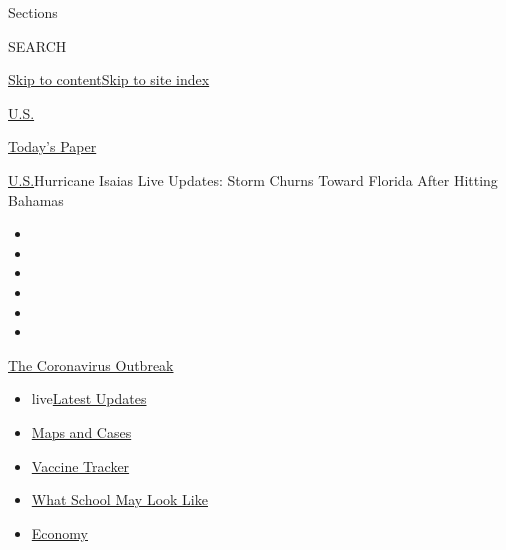 Sections

SEARCH

\protect\hyperlink{site-content}{Skip to
content}\protect\hyperlink{site-index}{Skip to site index}

\href{https://www.nytimes3xbfgragh.onion/section/us}{U.S.}

\href{https://myaccount.nytimes3xbfgragh.onion/auth/login?response_type=cookie\&client_id=vi}{}

\href{https://www.nytimes3xbfgragh.onion/section/todayspaper}{Today's
Paper}

\href{/section/us}{U.S.}\textbar{}Hurricane Isaias Live Updates: Storm
Churns Toward Florida After Hitting Bahamas

\begin{itemize}
\item
\item
\item
\item
\item
\item
\end{itemize}

\href{https://www.nytimes3xbfgragh.onion/news-event/coronavirus?action=click\&pgtype=Article\&state=default\&region=TOP_BANNER\&context=storylines_menu}{The
Coronavirus Outbreak}

\begin{itemize}
\tightlist
\item
  live\href{https://www.nytimes3xbfgragh.onion/2020/08/01/world/coronavirus-covid-19.html?action=click\&pgtype=Article\&state=default\&region=TOP_BANNER\&context=storylines_menu}{Latest
  Updates}
\item
  \href{https://www.nytimes3xbfgragh.onion/interactive/2020/us/coronavirus-us-cases.html?action=click\&pgtype=Article\&state=default\&region=TOP_BANNER\&context=storylines_menu}{Maps
  and Cases}
\item
  \href{https://www.nytimes3xbfgragh.onion/interactive/2020/science/coronavirus-vaccine-tracker.html?action=click\&pgtype=Article\&state=default\&region=TOP_BANNER\&context=storylines_menu}{Vaccine
  Tracker}
\item
  \href{https://www.nytimes3xbfgragh.onion/interactive/2020/07/29/us/schools-reopening-coronavirus.html?action=click\&pgtype=Article\&state=default\&region=TOP_BANNER\&context=storylines_menu}{What
  School May Look Like}
\item
  \href{https://www.nytimes3xbfgragh.onion/live/2020/07/31/business/stock-market-today-coronavirus?action=click\&pgtype=Article\&state=default\&region=TOP_BANNER\&context=storylines_menu}{Economy}
\end{itemize}

